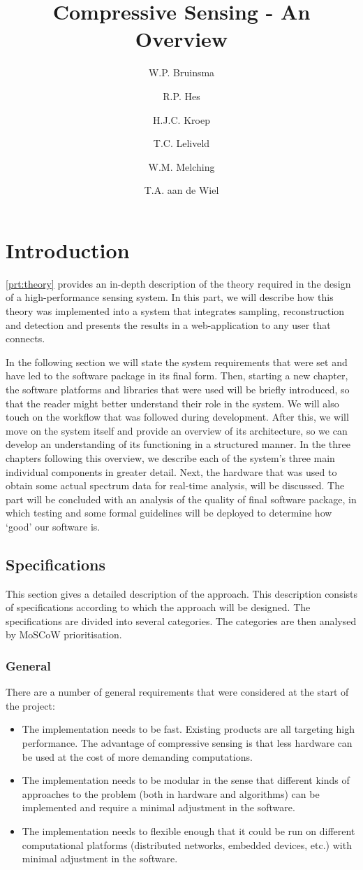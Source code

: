 \documentclass[a4paper, openany, oneside]{memoir}
\title{Compressive Sensing - An Overview}
\author{W.P. Bruinsma \and R.P. Hes \and H.J.C. Kroep \and T.C. Leliveld \and W.M. Melching \and T.A. aan de Wiel}
\begin{document}
\chapter{Introduction}
\cref{prt:theory} provides an in-depth description of the theory required in the design of a high-performance sensing system.
In this part, we will describe how this theory was implemented into a system that integrates sampling, reconstruction and detection and presents the results in a web-application to any user that connects.

In the following section we will state the system requirements that were set and have led to the software package in its final form. Then, starting a new chapter, the software platforms and libraries that were used will be briefly introduced, so that the reader might better understand their role in the system. We will also touch on the workflow that was followed during development. After this, we will move on the system itself and provide an overview of its architecture, so we can develop an understanding of its functioning in a structured manner. In the three chapters following this overview, we describe each of the system's three main individual components in greater detail. Next, the hardware that was used to obtain some actual spectrum data for real-time analysis, will be discussed. The part will be concluded with an analysis of the quality of final software package, in which testing and some formal guidelines will be deployed to determine how `good' our software is.

\section{Specifications}
\label{sec:implementation-specs}
This section gives a detailed description of the approach. This description consists of specifications according to which the approach will be designed. The specifications are divided into several categories. The categories are then analysed by MoSCoW prioritisation.

\subsection{General}
There are a number of general requirements that were considered at the start of the project:
\begin{itemize}
    \item The implementation needs to be fast. Existing products are all targeting high performance. The advantage of compressive sensing is that less hardware can be used at the cost of more demanding computations.
    \item The implementation needs to be modular in the sense that different kinds of approaches to the problem (both in hardware and algorithms) can be implemented and require a minimal adjustment in the software.
    \item The implementation needs to flexible enough that it could be run on different computational platforms (distributed networks, embedded devices, etc.) with minimal adjustment in the software.
\end{itemize}
\end{document}
